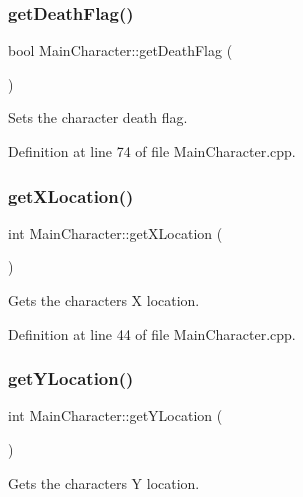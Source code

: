 \subsubsection{\texorpdfstring{getDeathFlag()}{getDeathFlag()}}
{\footnotesize\ttfamily bool Main\+Character\+::get\+Death\+Flag (\begin{DoxyParamCaption}{ }\end{DoxyParamCaption})}



Sets the character death flag. 



Definition at line 74 of file Main\+Character.\+cpp.

\mbox{\label{class_main_character_a1620795cfdb0168e4d67b31ca2b20c0f}} 
\subsubsection{\texorpdfstring{getXLocation()}{getXLocation()}}
{\footnotesize\ttfamily int Main\+Character\+::get\+X\+Location (\begin{DoxyParamCaption}{ }\end{DoxyParamCaption})}



Gets the character\textquotesingle{}s X location. 



Definition at line 44 of file Main\+Character.\+cpp.

\mbox{\label{class_main_character_a4f8b39a1d6b2a69776e2ae32492d98d9}} 
\subsubsection{\texorpdfstring{getYLocation()}{getYLocation()}}
{\footnotesize\ttfamily int Main\+Character\+::get\+Y\+Location (\begin{DoxyParamCaption}{ }\end{DoxyParamCaption})}



Gets the character\textquotesingle{}s Y location. 



